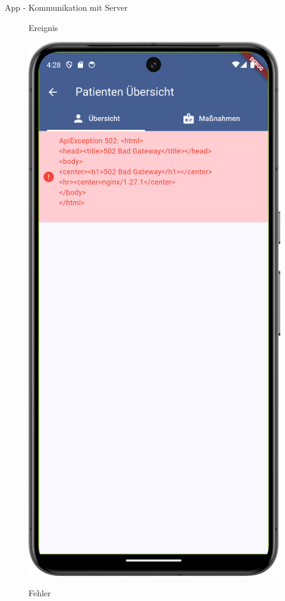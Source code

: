 \begin{frame}{App - Kommunikation mit Server}
\begin{figure}
\begin{minipage}{0.3\textwidth}
            \par{Ereignis}
        \end{minipage}
        \hspace{0.5cm}
        \begin{minipage}{0.3\textwidth}
            \centering
            \includegraphics[height=0.8\textheight]{images/app/screenshots/concurrency_error.png}
            \par{Fehler}
        \end{minipage}
    \end{figure}
    \vfill
\end{frame}
